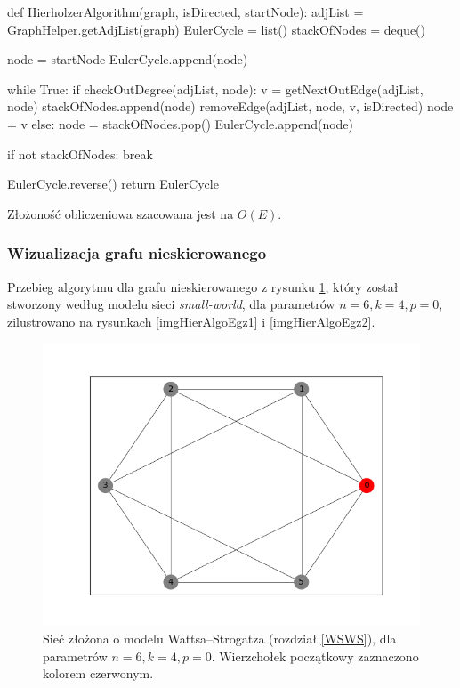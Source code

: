 \documentclass[a4paper, 12pt, twoside, openright]{article}
\begin{document}
\captionsetup{justification=centering}
\begin{algorithm}[caption={\textit{HierholzerAlgorithm} funkcja wyznaczająca ścieżkę dla grafów skierowanych i nieskierowanych }, label={HierholzerAlgorithm}]
def HierholzerAlgorithm(graph, isDirected, startNode):
	adjList = GraphHelper.getAdjList(graph)
	EulerCycle = list()
	stackOfNodes = deque()
	
	node = startNode
	EulerCycle.append(node)
	
	while True:
		if checkOutDegree(adjList, node):
			v = getNextOutEdge(adjList, node)
			stackOfNodes.append(node)
			removeEdge(adjList, node, v, isDirected)
			node = v
		else:
			node = stackOfNodes.pop()
			EulerCycle.append(node)
		
		if not stackOfNodes:
			break
		
	EulerCycle.reverse()
	return EulerCycle
\end{algorithm}

	Złożoność obliczeniowa szacowana jest na $O(E)$.
\subsubsection{Wizualizacja grafu nieskierowanego}
\indent\par
	Przebieg algorytmu dla grafu nieskierowanego z rysunku \ref{h_graph}, który został stworzony według modelu sieci \textit{small-world}, dla parametrów $n=6, k=4, p=0$, zilustrowano na rysunkach \ref{imgHierAlgoEgz1} i \ref{imgHierAlgoEgz2}.
	
	\begin{figure}[!htb]
		\centering
		\includegraphics[width=1\textwidth]{img/heiAlgo/hei_algo0.png}
		\caption[]{Sieć złożona o modelu  Wattsa–Strogatza (rozdział \ref{WSWS}), dla parametrów $n=6, k=4, p=0$. Wierzchołek początkowy zaznaczono kolorem czerwonym.}
		\label{h_graph}
	\end{figure}	
\end{document}
